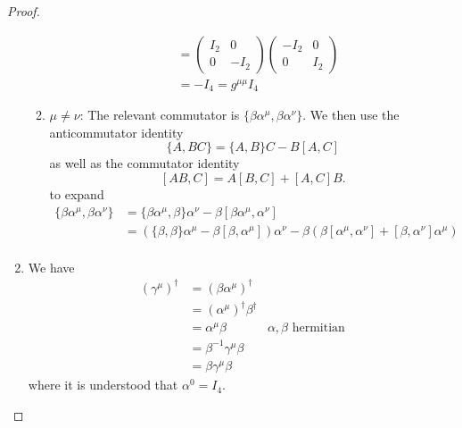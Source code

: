 \begin{proof}
\begin{enumerate}[label=(\alph*)]
\begin{enumerate}[label=(\arabic*)]
\begin{align*}
		       &=\begin{pmatrix} I_2 & 0 \\ 0 & -I_2 \end{pmatrix} \begin{pmatrix} -I_2 & 0 \\ 0 & I_2 \end{pmatrix}   \\
		       &= -I_4 = g^{\mu\mu}I_4
	\end{align*}
\item $\mu\neq\nu$:
	The relevant commutator is $\{\beta\alpha^\mu, \beta\alpha^\nu\}$. We then use the anticommutator identity
	 \[
		 \{A, BC\} = \{A, B\}C - B[A,C]
	\] 
	as well as the commutator identity
\[
	[AB, C] = A[B,C]+[A,C]B
.\] 
	to expand
	\begin{align*}
		\{\beta \alpha^\mu, \beta\alpha^\nu\} &= \{\beta\alpha^\mu, \beta\}\alpha^\nu - \beta[\beta\alpha^\mu, \alpha^\nu] \\
						      &= (\{\beta, \beta\}\alpha^\mu - \beta[\beta, \alpha^\mu])\alpha^\nu - \beta(\beta[\alpha^\mu,\alpha^\nu]+[\beta, \alpha^\nu]\alpha^\mu)  \\
	\end{align*}
		\end{enumerate}
	\item We have
		\begin{align*}
			(\gamma^\mu)^\dagger &= (\beta\alpha^\mu)^\dagger\\
					     &= (\alpha^\mu)^\dagger \beta^\dagger \\
					     &= \alpha^\mu \beta & \alpha,\beta\text{ hermitian}\\
					     &= \beta^{-1}\gamma^\mu \beta\\
					     &= \beta \gamma^{\mu}\beta
		\end{align*}
		where it is understood that $\alpha^0=I_4$.
\end{enumerate}
\end{proof}

